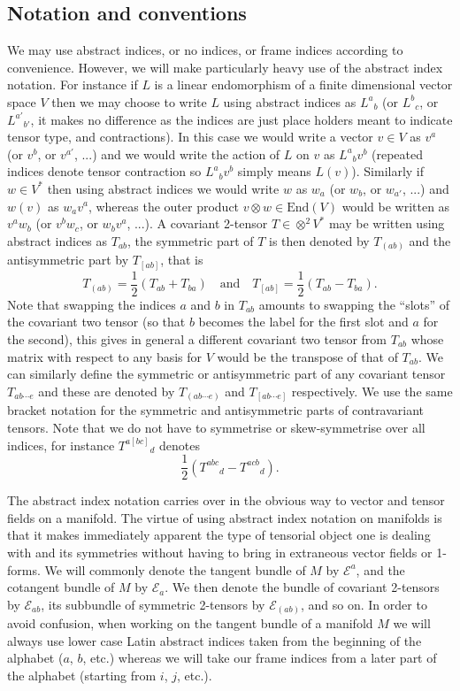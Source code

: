 \documentclass[a4paper,12pt]{amsart}
\def\Cal{\mathcal}
\newcommand{\ce}{{\Cal E}}
\theoremstyle{remark}
\begin{document}
\subsection{Notation and conventions} We may use abstract indices, or no indices, or frame indices according to convenience. However, we will make particularly heavy use of the abstract index notation. For instance if $L$ is a linear endomorphism of a finite dimensional vector space $V$ then we may choose to write $L$ using    abstract indices as $L^a{_b}$ (or $L^b{_c}$, or $L^{a'}{_{b'}}$, it makes no difference as the indices are just place holders meant to indicate tensor type, and contractions). In this case we would write a vector $v\in V$ as $v^a$ (or $v^b$, or $v^{a'}$, ...) and we would write the action of $L$ on $v$ as $L^a{_b}v^b$ (repeated indices denote tensor contraction so $L^a{_b}v^b$ simply means $L(v)$). Similarly if $w\in V^*$ then using abstract indices we would write $w$ as $w_a$ (or $w_b$, or $w_{a'}$, ...) and $w(v)$ as $w_a v^a$, whereas the outer product $v\otimes w \in \mathrm{End}(V)$ would be written as $v^a w_b$ (or $v^b w_c$, or $w_b v^a$, ...). A covariant 2-tensor $T\in \otimes^2 V^*$ may be written using abstract indices as $T_{ab}$, the symmetric part of $T$ is then denoted by $T_{(ab)}$ and the antisymmetric part by $T_{[ab]}$, that is
$$
T_{(ab)}=\frac{1}{2} \left(T_{ab}+T_{ba}\right) \quad \mbox{and} \quad T_{[ab]}=\frac{1}{2} \left(T_{ab}-T_{ba}\right).
$$
Note that swapping the indices $a$ and $b$ in $T_{ab}$ amounts to swapping the ``slots'' of the covariant two tensor (so that $b$ becomes the label for the first slot and $a$ for the second), this gives in general a different covariant two tensor from $T_{ab}$ whose matrix with respect to any basis for $V$ would be the transpose of that of $T_{ab}$. We can similarly define the symmetric or antisymmetric part of any covariant tensor $T_{ab\cdots e}$ and these are denoted by $T_{(ab\cdots e)}$ and $T_{[ab\cdots e]}$ respectively. We use the same bracket notation for the symmetric and antisymmetric parts of contravariant tensors. Note that we do not have to symmetrise or skew-symmetrise over all indices, for instance $T^{a[bc]}{_d}$ denotes
$$
\frac{1}{2} \left(T^{abc}{_d} - T^{acb}{_d}\right). 
$$

The abstract index notation carries over in the obvious way to vector and tensor fields on a manifold. The virtue of using abstract index notation on manifolds is that it makes immediately apparent the type of tensorial object one is dealing with and its symmetries without having to bring in extraneous vector fields or 1-forms. We will commonly denote the tangent bundle of $M$ by $\ce^a$, and the cotangent bundle of $M$ by $\ce_a$. We then denote the bundle of covariant 2-tensors by $\ce_{ab}$, its subbundle of symmetric 2-tensors by $\ce_{(ab)}$, and so on. In order to avoid confusion, when working on the tangent bundle of a manifold $M$ we will always use lower case Latin abstract indices taken from the beginning of the alphabet ($a$, $b$, etc.) whereas we will take our frame indices from a later part of the alphabet (starting from $i$, $j$, etc.). 
\end{document}
